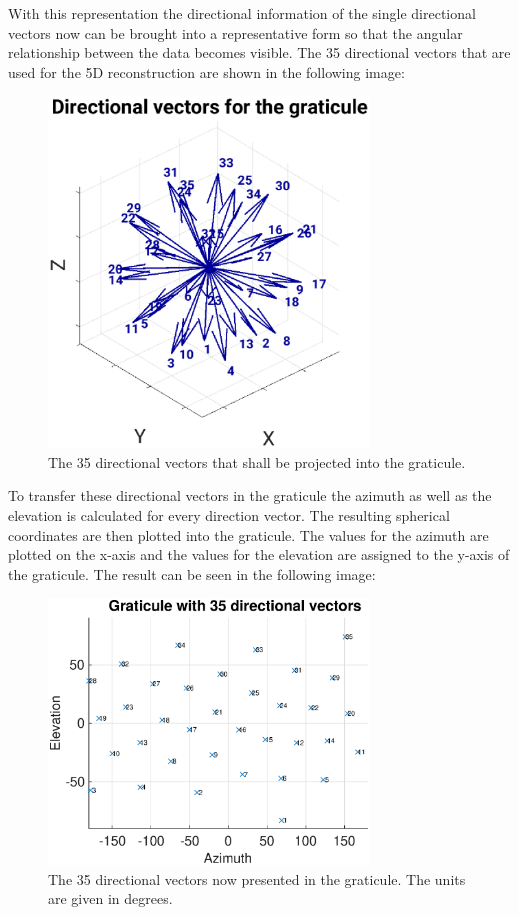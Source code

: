 With this representation the directional information of the single directional vectors now can be brought into a representative form so that the angular relationship between the data becomes visible. The 35 directional vectors that are used for the 5D reconstruction are shown in the following image: 

\begin{figure}[H]
    \centering
    \includegraphics[width=0.76\textwidth]{Graphics/Results/gradnetz/directional_vectors_for_gradnetz.eps}
    \caption{The 35 directional vectors that shall be projected into the graticule. }
    \label{fig:gadnetz_directional_vectors}
\end{figure}

To transfer these directional vectors in the graticule the azimuth as well as the elevation is calculated for every direction vector. The resulting spherical coordinates are then plotted into the graticule. The values for the azimuth are plotted on the x-axis and the values for the elevation are assigned to the y-axis of the graticule. The result can be seen in the following image:

\begin{figure}[H]
    \centering
    \includegraphics[width=0.76\textwidth]{Graphics/Results/gradnetz/graticule_35_vectors.eps}
    \caption{The 35 directional vectors now presented in the graticule. The units are given in degrees. }
    \label{fig:fertig_gradnetz}
\end{figure}

